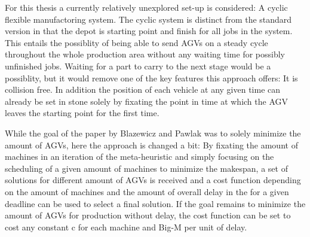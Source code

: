 For this thesis a currently relatively unexplored set-up is considered: A cyclic flexible manufactoring system. The cyclic system is
distinct from the standard version in that the depot is starting point and finish for all jobs in the system. This entails the possiblity of
being able to send AGVs on a steady cycle throughout the whole production area without any waiting time for possibly unfinished jobs. Waiting
for a part to carry to the next stage would be a possiblity, but it would remove one of the key features this approach offers: It is collision
free. In addition the position of each vehicle at any given time can already be set in stone solely by fixating the point in time at which the
AGV leaves the starting point for the first time. 



While the goal of the paper by Blazewicz and Pawlak was to solely minimize the amount of AGVs, here the approach is changed a bit:
By fixating the amount of machines in an iteration of the meta-heuristic and simply focusing on the scheduling of a given
amount of machines to minimize the makespan, a set of solutions for different amount of AGVs is received and a cost function depending
on the amount of machines and the amount of overall delay in the for a given deadline can be used to select a final
solution. If the goal remains to minimize the amount of AGVs for production without delay, the cost function can be set
to cost any constant c for each machine and Big-M per unit of delay.






